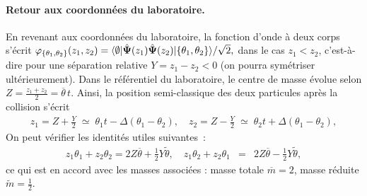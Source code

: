 




\paragraph{Retour aux coordonnées du laboratoire.}

En revenant aux coordonnées du laboratoire, la fonction d’onde à deux corps s’écrit
\(
	\varphi_{\{\theta_1 , \theta_2\}} (z_1, z_2) 
	= \langle \emptyset \vert \hat{\bm{\Psi}} (z_1)\hat{\bm{\Psi}} (z_2) \vert \{\theta_1, \theta_2\} \rangle/\sqrt{2},
\)
dans le cas \(z_1 < z_2\), c’est-à-dire pour une séparation relative \(Y = z_1 - z_2 < 0\) (on pourra symétriser ultérieurement).  
Dans le référentiel du laboratoire, le centre de masse évolue selon
\(
	Z = \frac{z_1 + z_2}{2} = \overline{\theta}\,t.
\)
Ainsi, la position semi-classique des deux particules après la collision s’écrit
\begin{eqnarray}
	z_1 = Z + \frac{Y}{2} \;\simeq\; \theta_1 t - \Delta(\theta_1 - \theta_2),\quad
	z_2 = Z - \frac{Y}{2} \;\simeq\; \theta_2 t + \Delta(\theta_1 - \theta_2),
\end{eqnarray}
On peut vérifier les identités utiles suivantes :
\begin{eqnarray*}
	z_1 \theta_1 + z_2 \theta_2 = 2Z \overline{\theta} + \frac{1}{2} Y \tilde{\theta}, \quad
	z_1 \theta_2 + z_2 \theta_1 &=& 2Z \overline{\theta} - \frac{1}{2} Y \tilde{\theta},
\end{eqnarray*}
ce qui est en accord avec les masses associées : masse totale \(\overline{m} = 2\), masse réduite \(\tilde{m} = \frac{1}{2}\).


